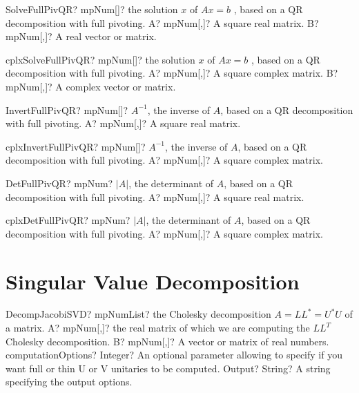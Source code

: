 \documentclass[12pt,a4paper,openany]{book}
\begin{document}
\begin{mpFunctionsExtract}
\mpFunctionTwo
{SolveFullPivQR? mpNum[]? the solution $x$ of $A x = b$ , based on a QR decomposition with full pivoting.}
{A? mpNum[,]? A square real matrix.}
{B? mpNum[,]? A real vector or matrix.}
\end{mpFunctionsExtract}

\begin{mpFunctionsExtract}
\mpFunctionTwo
{cplxSolveFullPivQR? mpNum[]? the solution $x$ of $A x = b$ , based on a QR decomposition with full pivoting.}
{A? mpNum[,]? A square complex matrix.}
{B? mpNum[,]? A complex vector or matrix.}
\end{mpFunctionsExtract}

\begin{mpFunctionsExtract}
\mpFunctionOne
{InvertFullPivQR? mpNum[]? $A^{-1}$, the inverse of $A$, based on a QR decomposition with full pivoting.}
{A? mpNum[,]? A square real matrix.}
\end{mpFunctionsExtract}

\begin{mpFunctionsExtract}
\mpFunctionOne
{cplxInvertFullPivQR? mpNum[]? $A^{-1}$, the inverse of $A$, based on a QR decomposition with full pivoting.}
{A? mpNum[,]? A square complex matrix.}
\end{mpFunctionsExtract}

\begin{mpFunctionsExtract}
\mpFunctionOne
{DetFullPivQR? mpNum? $|A|$, the determinant of $A$, based on a QR decomposition with full pivoting.}
{A? mpNum[,]? A square real matrix.}
\end{mpFunctionsExtract}

\begin{mpFunctionsExtract}
\mpFunctionOne
{cplxDetFullPivQR? mpNum? $|A|$, the determinant of $A$, based on a QR decomposition with full pivoting.}
{A? mpNum[,]? A square complex matrix.}
\end{mpFunctionsExtract}

\section{Singular Value Decomposition}

\begin{mpFunctionsExtract}
\mpFunctionFour
{DecompJacobiSVD? mpNumList? the Cholesky decomposition $A = LL^* = U^*U$ of a matrix.}
{A? mpNum[,]? the real matrix of which we are computing the $LL^T$ Cholesky decomposition.}
{B? mpNum[,]? A vector or matrix of real numbers.}
{computationOptions? Integer? An optional parameter allowing to specify if you want full or thin U or V unitaries to be computed.}
{Output? String? A string specifying the output options.}
\end{mpFunctionsExtract}
\end{document}
